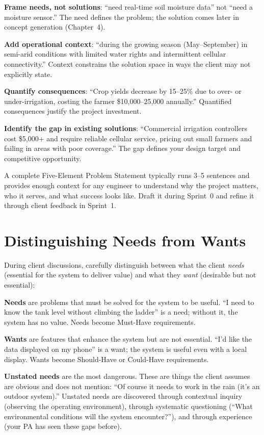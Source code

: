 \textbf{Frame needs, not solutions}: ``need real-time soil moisture data'' not ``need a moisture sensor.'' The need defines the problem; the solution comes later in concept generation (Chapter~4).

\textbf{Add operational context}: ``during the growing season (May--September) in semi-arid conditions with limited water rights and intermittent cellular connectivity.'' Context constrains the solution space in ways the client may not explicitly state.

\textbf{Quantify consequences}: ``Crop yields decrease by 15--25\% due to over- or under-irrigation, costing the farmer \$10,000--25,000 annually.'' Quantified consequences justify the project investment.

\textbf{Identify the gap in existing solutions}: ``Commercial irrigation controllers cost \$5,000+ and require reliable cellular service, pricing out small farmers and failing in areas with poor coverage.'' The gap defines your design target and competitive opportunity.

A complete Five-Element Problem Statement typically runs 3--5 sentences and provides enough context for any engineer to understand why the project matters, who it serves, and what success looks like. Draft it during Sprint~0 and refine it through client feedback in Sprint~1.



\section{Distinguishing Needs from Wants}
During client discussions, carefully distinguish between what the client \emph{needs} (essential for the system to deliver value) and what they \emph{want} (desirable but not essential):

\textbf{Needs} are problems that must be solved for the system to be useful. ``I need to know the tank level without climbing the ladder'' is a need; without it, the system has no value. Needs become Must-Have requirements.

\textbf{Wants} are features that enhance the system but are not essential. ``I'd like the data displayed on my phone'' is a want; the system is useful even with a local display. Wants become Should-Have or Could-Have requirements.

\textbf{Unstated needs} are the most dangerous. These are things the client assumes are obvious and does not mention: ``Of course it needs to work in the rain (it's an outdoor system).'' Unstated needs are discovered through contextual inquiry (observing the operating environment), through systematic questioning (``What environmental conditions will the system encounter?''), and through experience (your PA has seen these gaps before).

